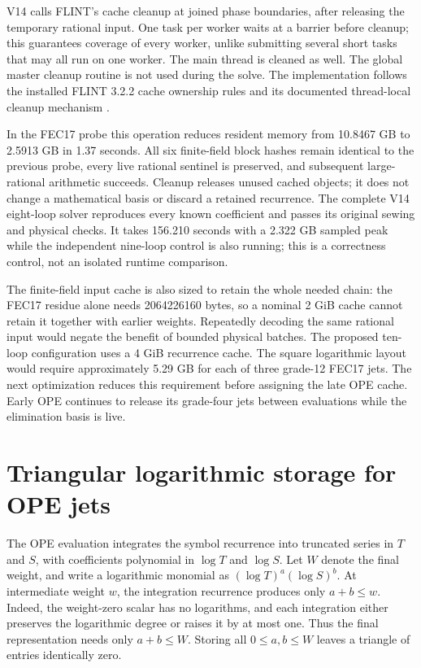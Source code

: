 \documentclass[11pt]{article}
\begin{document}
V14 calls FLINT's cache cleanup at joined phase boundaries, after releasing
the temporary rational input. One task per worker waits at a barrier before
cleanup; this guarantees coverage of every worker, unlike submitting several
short tasks that may all run on one worker. The main thread is cleaned as
well. The global master cleanup routine is not used during the solve.
The implementation follows the installed FLINT 3.2.2 cache ownership rules
and its documented thread-local cleanup mechanism \cite{flintmemory}.

In the FEC17 probe this operation reduces resident memory from
10.8467 GB to 2.5913 GB in 1.37 seconds. All six finite-field block hashes
remain identical to the previous probe, every live rational sentinel is
preserved, and subsequent large-rational arithmetic succeeds. Cleanup
releases unused cached objects; it does not change a mathematical basis or
discard a retained recurrence. The complete V14 eight-loop solver reproduces
every known coefficient and passes its original sewing and physical checks.
It takes 156.210 seconds with a 2.322 GB sampled peak while the independent
nine-loop control is also running; this is a correctness control, not an
isolated runtime comparison.

The finite-field input cache is also sized to retain the whole needed chain:
the FEC17 residue alone needs 2064226160 bytes, so a nominal 2 GiB cache
cannot retain it together with earlier weights. Repeatedly decoding the
same rational input would negate the benefit of bounded physical batches.
The proposed ten-loop configuration uses a 4 GiB recurrence cache. The
square logarithmic layout would require approximately 5.29 GB for each of
three grade-12 FEC17 jets. The next optimization reduces this requirement
before assigning the late OPE cache. Early OPE continues to release its
grade-four jets between evaluations while the elimination basis is live.

\section{Triangular logarithmic storage for OPE jets}
The OPE evaluation integrates the symbol recurrence into truncated series in
$T$ and $S$, with coefficients polynomial in $\log T$ and $\log S$.
Let $W$ denote the final weight, and write a logarithmic monomial as
$(\log T)^a(\log S)^b$. At intermediate weight $w$, the integration recurrence
produces only $a+b\leq w$. Indeed, the weight-zero scalar has no logarithms,
and each integration either preserves the logarithmic degree or raises it
by at most one. Thus the final representation needs only $a+b\leq W$.
Storing all $0\leq a,b\leq W$ leaves a triangle of entries identically zero.
\end{document}
